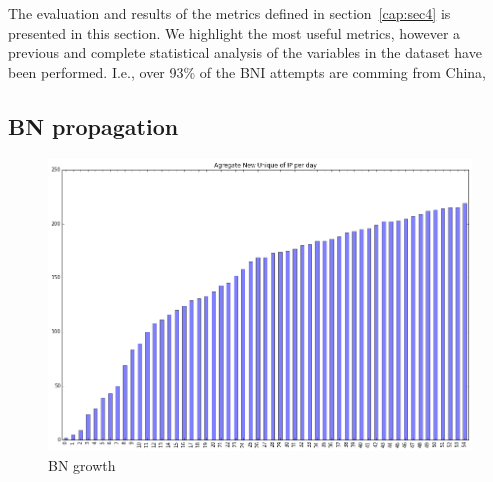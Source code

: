 
The evaluation and results of the metrics defined in section~\ref{cap:sec4} is presented in this section. We highlight the most useful metrics, however a previous and complete statistical analysis of the variables in the dataset have been performed. I.e., over 93\% of the BNI attempts are comming from China,

\subsection{BN propagation}
\begin{figure}[h]
    \label{fig:agg_grow}
    \caption{BN growth}
    \centering
    \includegraphics[width=\linewidth]{images/a_new_ip_da}
\end{figure}



